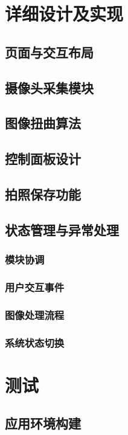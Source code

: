 \documentclass[UTF8,a4paper,zihao=-4,oneside,openany,fontset=none]{ctexrep}
\numberwithin{equation}{chapter}
\begin{document}
\chapter{详细设计及实现}
\section{页面与交互布局}

\section{摄像头采集模块}

\section{图像扭曲算法}

\section{控制面板设计}

\section{拍照保存功能}

\section{状态管理与异常处理}
\subsection{模块协调}

\subsection{用户交互事件}

\subsection{图像处理流程}

\subsection{系统状态切换}

\chapter{测试}
\section{应用环境构建}
\end{document}
